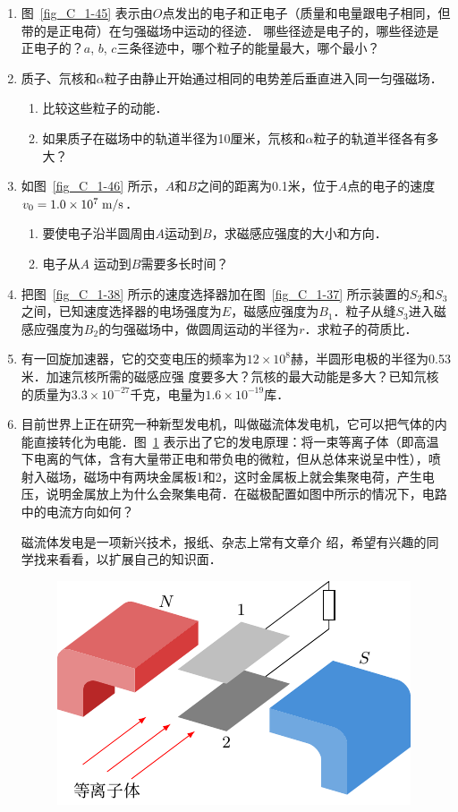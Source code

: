 \begin{enumerate}
\item 图~\ref{fig_C_1-45} 表示由$O$点发出的电子和正电子（质量和电量跟电子相同，但带的是正电荷）在匀强磁场中运动的径迹．
哪些径迹是电子的，哪些径迹是正电子的？$a$, $b$, $c$三条径迹中，哪个粒子的能量最大，哪个最小？
\item 质子、氘核和$\alpha$粒子由静止开始通过相同的电势差后垂直进入同一匀强磁场．
\begin{enumerate}
    \item 比较这些粒子的动能．
    \item 如果质子在磁场中的轨道半径为10厘米，氘核和$\alpha$粒子的轨道半径各有多大？
\end{enumerate}
\item 如图~\ref{fig_C_1-46} 所示，$A$和$B$之间的距离为0.1米，位于$A$点的电子的速度$v_0=1.0\times10^7\;\text{m}/\text{s}$．
\begin{enumerate}
    \item 要使电子沿半圆周由$A$运动到$B$，求磁感应强度的大小和方向．
    \item 电子从$A$
运动到$B$需要多长时间？
\end{enumerate}
\item 把图~\ref{fig_C_1-38} 所示的速度选择器加在图~\ref{fig_C_1-37} 所示装置的$S_2$和$S_3$之间，已知速度选择器的电场强度为$E$，磁感应强度为$B_1$．粒子从缝$S_3$进入磁感应强度为$B_2$的匀强磁场中，做圆周运动的半径为$r$．求粒子的荷质比．
\item  有一回旋加速器，它的交变电压的频率为$12\times10^8$赫，半圆形电极的半径为0.53米．加速氘核所需的磁感应强
度要多大？氘核的最大动能是多大？已知氘核的质量为$3.3\times10^{-27}$千克，电量为$1.6\times10^{-19}$库．
\item 目前世界上正在研究一种新型发电机，叫做磁流体发电机，它可以把气体的内能直接转化为电能．图~\ref{fig_C_1-47} 表示出了它的发电原理：将一束等离子体（即高温下电离的气体，含有大量带正电和带负电的微粒，但从总体来说呈中性），喷射入磁场，磁场中有两块金属板1和2，这时金属板上就会集聚电荷，产生电压，说明金属放上为什么会聚集电荷．在磁极配置如图中所示的情况下，电路中的电流方向如何？

磁流体发电是一项新兴技术，报纸、杂志上常有文章介
绍，希望有兴趣的同学找来看看，以扩展自己的知识面．

\begin{figure}[htbp]
    \centering
    \includegraphics{fig/C/1-47.pdf}
    \caption{}\label{fig_C_1-47}
\end{figure}


\end{enumerate}

